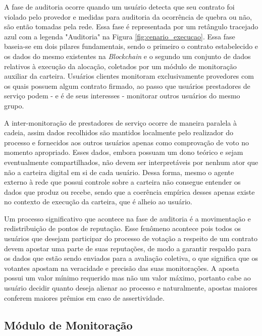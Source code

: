 A fase de auditoria ocorre quando um usuário detecta que seu contrato foi violado pelo provedor e medidas para auditoria da ocorrência de quebra ou não, são então tomadas pela rede. Essa fase é representada por um retângulo tracejado azul com a legenda "Auditoria" na Figura \ref{fig:cenario_execucao}. Essa fase baseia-se em dois pilares fundamentais, sendo o primeiro o contrato estabelecido e os dados do mesmo existentes na \textit{Blockchain} e o segundo um conjunto de dados relativos à execução da alocação, coletados por um módulo de monitoração auxiliar da carteira.
%
Usuários clientes monitoram exclusivamente provedores com os quais possuem algum contrato firmado, ao passo que usuários prestadores de serviço podem - e é de seus interesses - monitorar outros usuários do mesmo grupo.

%
A inter-monitoração de prestadores de serviço ocorre de maneira paralela à cadeia, assim dados recolhidos são mantidos localmente pelo realizador do processo e fornecidos aos outros usuários apenas como comprovação de voto no momento apropriado. Esses dados, embora possuam um dono teórico e sejam eventualmente compartilhados, não devem ser interpretáveis por nenhum ator que não a carteira digital em si de cada usuário. Dessa forma, mesmo o agente externo à rede que possui controle sobre a carteira não consegue entender os dados que produz ou recebe, sendo que a coerência empírica desses apenas existe no contexto de execução da carteira, que é alheio ao usuário.

%
Um processo significativo que acontece na fase de auditoria é a movimentação e redistribuição de pontos de reputação. Esse fenômeno acontece pois todos os usuários que desejam participar do processo de votação a respeito de um contrato devem apostar uma parte de suas reputações, de modo a garantir respaldo para os dados que estão sendo enviados para a avaliação coletiva, o que significa que os votantes apostam na veracidade e precisão das suas monitorações. A aposta possui um valor mínimo requerido mas não um valor máximo, portanto cabe ao usuário decidir quanto deseja alienar ao processo e naturalmente, apostas maiores conferem maiores prêmios em caso de assertividade.

\subsection{Módulo de Monitoração}
\label{sec:proposta:monitoracao}

